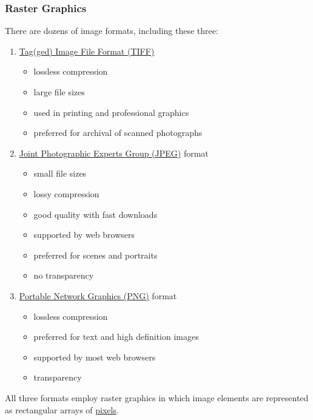 \documentclass[
  11pt,
  british,
  a4paper,
]{article}
\providecommand{\tightlist}{%
  \setlength{\itemsep}{0pt}\setlength{\parskip}{0pt}}
\begin{document}
\hypertarget{raster-graphics}{%
\subsubsection{Raster Graphics}\label{raster-graphics}}

There are dozens of image formats, including these three:

\begin{enumerate}
\tightlist
\item
  \href{https://en.wikipedia.org/wiki/TIFF}{Tag(ged) Image File Format
  (TIFF)}

  \begin{itemize}
  \tightlist
  \item
    lossless compression
  \item
    large file sizes
  \item
    used in printing and professional graphics
  \item
    preferred for archival of scanned photographs
  \end{itemize}
\item
  \href{https://jpeg.org/about.html}{Joint Photographic Experts Group
  (JPEG)} format

  \begin{itemize}
  \tightlist
  \item
    small file sizes
  \item
    lossy compression
  \item
    good quality with fast downloads
  \item
    supported by web browsers
  \item
    preferred for scenes and portraits
  \item
    no transparency
  \end{itemize}
\item
  \href{http://www.libpng.org/pub/png/}{Portable Network Graphics (PNG)}
  format

  \begin{itemize}
  \tightlist
  \item
    lossless compression
  \item
    preferred for text and high definition images
  \item
    supported by most web browsers
  \item
    transparency
  \end{itemize}
\end{enumerate}

All three formats employ raster graphics in which image elements are
represented as rectangular arrays of
\href{https://en.wikipedia.org/wiki/Pixels}{pixels}.
\end{document}
